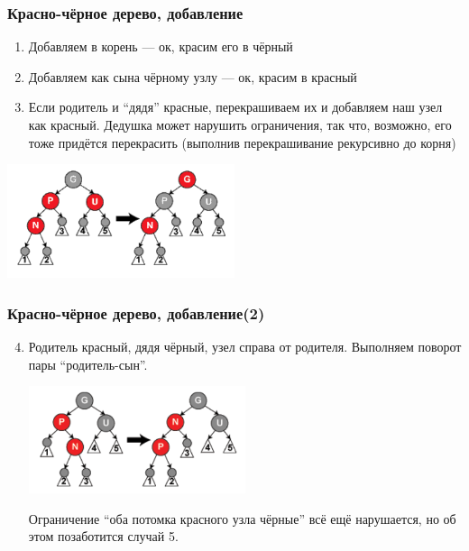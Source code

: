 \documentclass[xetex,mathserif,serif]{beamer}
\begin{document}
	\begin{frame}
		\frametitle{Красно-чёрное дерево, добавление}
		\begin{enumerate}
			\item Добавляем в корень --- ок, красим его в чёрный
			\item Добавляем как сына чёрному узлу --- ок, красим в красный
			\item Если родитель и ``дядя'' красные, перекрашиваем их и добавляем наш узел как красный. Дедушка может нарушить ограничения, так что, возможно, его тоже придётся перекрасить (выполнив перекрашивание рекурсивно до корня)
		\end{enumerate}
		\begin{center}
			\includegraphics[width=0.5\textwidth]{addition-to-red-black-tree.png}
		\end{center}
	\end{frame}

	\begin{frame}
		\frametitle{Красно-чёрное дерево, добавление(2)}
		\begin{enumerate}
			\setcounter{enumi}{3}
			\item Родитель красный, дядя чёрный, узел справа от родителя. Выполняем поворот пары ``родитель-сын''.
			\begin{center}
				\includegraphics[width=0.5\textwidth]{addition-to-red-black-tree2.png}
			\end{center}
			Ограничение ``оба потомка красного узла чёрные'' всё ещё нарушается, но об этом позаботится случай 5.
		\end{enumerate}
	\end{frame}
\end{document}
